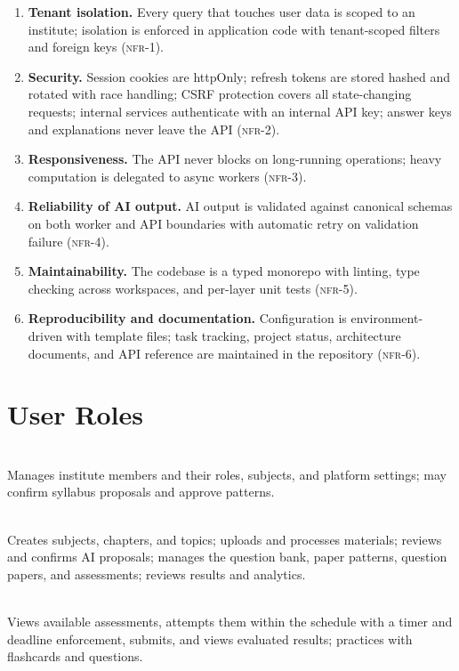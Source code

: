 \begin{enumerate}
  \item \textbf{Tenant isolation.} Every query that touches user data is
        scoped to an institute; isolation is enforced in application code with
        tenant-scoped filters and foreign keys (\textsc{nfr-1}).
  \item \textbf{Security.} Session cookies are httpOnly; refresh tokens are
        stored hashed and rotated with race handling; CSRF protection covers
        all state-changing requests; internal services authenticate with an
        internal API key; answer keys and explanations never leave the API
        (\textsc{nfr-2}).
  \item \textbf{Responsiveness.} The API never blocks on long-running
        operations; heavy computation is delegated to async workers
        (\textsc{nfr-3}).
  \item \textbf{Reliability of AI output.} AI output is validated against
        canonical schemas on both worker and API boundaries with automatic
        retry on validation failure (\textsc{nfr-4}).
  \item \textbf{Maintainability.} The codebase is a typed monorepo with linting,
        type checking across workspaces, and per-layer unit tests
        (\textsc{nfr-5}).
  \item \textbf{Reproducibility and documentation.} Configuration is
        environment-driven with template files; task tracking, project status,
        architecture documents, and API reference are maintained in the
        repository (\textsc{nfr-6}).
\end{enumerate}

\section{User Roles}

\begin{description}[leftmargin=1em]
  \item[\textsc{Institute Administrator}]\hfill\\
        Manages institute members and their roles, subjects, and platform
        settings; may confirm syllabus proposals and approve patterns.
  \item[\textsc{Teacher}]\hfill\\
        Creates subjects, chapters, and topics; uploads and processes
        materials; reviews and confirms AI proposals; manages the question
        bank, paper patterns, question papers, and assessments; reviews
        results and analytics.
  \item[\textsc{Student}]\hfill\\
        Views available assessments, attempts them within the schedule with a
        timer and deadline enforcement, submits, and views evaluated results;
        practices with flashcards and questions.
\end{description}

